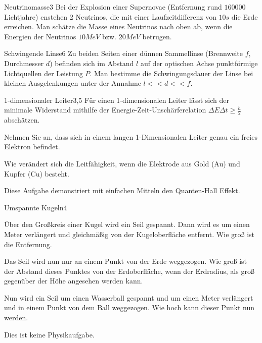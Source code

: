 


\begin{problem}{Neutrinomasse}{3}
Bei der Explosion einer Supernovae (Entfernung rund $160000$ Lichtjahre) enstehen 2 Neutrinos, die mit einer Laufzeitdifferenz von $10\unit{s}$ die Erde erreichen. Man schätze die Masse eines Neutrinos nach oben ab, wenn die Energien der Neutrinos $10\unit{MeV}$ bzw. $20\unit{MeV}$ betrugen.
\end{problem}

\begin{problem}{Schwingende Linse}{6}
Zu beiden Seiten einer dünnen Sammellinse (Brennweite $f$, Durchmesser $d$) befinden sich im Abstand $l$ auf der optischen Achse punktförmige Lichtquellen der Leistung $P$. Man bestimme die Schwingungsdauer der Linse bei kleinen Ausgelenkungen unter der Annahme $l<<d<<f$.
\end{problem}

\begin{problem}{1-dimensionaler Leiter}{3,5}
Für einen 1-dimensionalen Leiter lässt sich der minimale Widerstand mithilfe der Energie-Zeit-Unschärferelation $\Delta E\Delta t \geq \frac h2$ abschätzen.
\begin{abcenum}
 \item Nehmen Sie an, dass sich in einem langen 1-Dimensionalen Leiter genau ein freies Elektron befindet.
 \item Wie verändert sich die Leitfähigkeit, wenn die Elektrode aus Gold (Au) und Kupfer (Cu) besteht.
\end{abcenum}
Diese Aufgabe demonstriert mit einfachen Mitteln den Quanten-Hall Effekt.
\end{problem}

\begin{problem}{Umspannte Kugeln}{4}
\begin{abcenum}
 \item Über den Großkreis einer Kugel wird ein Seil gespannt. Dann wird es um einen Meter verlängert und gleichmäßig von der Kugeloberfläche entfernt. Wie groß ist die Entfernung.
 \item Das Seil wird nun nur an einem Punkt von der Erde weggezogen. Wie groß ist der Abstand dieses Punktes von der Erdoberfläche, wenn der Erdradius, als groß gegenüber der Höhe angesehen werden kann.
 \item Nun wird ein Seil um einen Wasserball gespannt und um einen Meter verlängert und in einem Punkt von dem Ball weggezogen. Wie hoch kann dieser Punkt nun werden.
\end{abcenum}
\begin{solution}
Dies ist keine Physikaufgabe.
\end{solution}
\end{problem}

